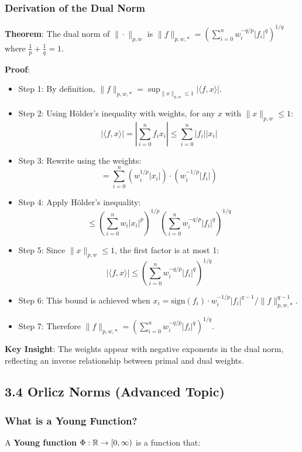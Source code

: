 \documentclass{amsart}
\let\originalmathbb\mathbb
\renewcommand{\mathbb}[1]{%
    \ifstrequal{#1}{1}{\mathbbm{#1}}{\originalmathbb{#1}}%
}
\theoremstyle{plain}
\theoremstyle{definition}
\theoremstyle{remark}
\begin{document}
\subsubsection{Derivation of the Dual Norm}

\textbf{Theorem}: The dual norm of $\|\cdot\|_{p,w}$ is $\|f\|_{p,w,*} = \left( \sum_{i=0}^n w_i^{-q/p} |f_i|^q \right)^{1/q}$ where $\frac{1}{p} + \frac{1}{q} = 1$.

\textbf{Proof}:

\begin{itemize}
	\item Step 1: By definition, $\|f\|_{p,w,*} = \sup_{\|x\|_{p,w} \leq 1} |\langle f, x \rangle|$.
	\item Step 2: Using Hölder's inequality with weights, for any $x$ with $\|x\|_{p,w} \leq 1$:
\[
|\langle f, x \rangle| = \left|\sum_{i=0}^n f_i x_i\right| \leq \sum_{i=0}^n |f_i| |x_i|
\]
	\item Step 3: Rewrite using the weights:
\[
= \sum_{i=0}^n (w_i^{1/p} |x_i|) \cdot (w_i^{-1/p} |f_i|)
\]
	\item Step 4: Apply Hölder's inequality:
\[
\leq \left(\sum_{i=0}^n w_i |x_i|^p\right)^{1/p} \left(\sum_{i=0}^n w_i^{-q/p} |f_i|^q\right)^{1/q}
\]
	\item Step 5: Since $\|x\|_{p,w} \leq 1$, the first factor is at most 1:
\[
|\langle f, x \rangle| \leq \left(\sum_{i=0}^n w_i^{-q/p} |f_i|^q\right)^{1/q}
\]
	\item Step 6: This bound is achieved when $x_i = \text{sign}(f_i) \cdot w_i^{-1/p} |f_i|^{q-1} / \|f\|_{p,w,*}^{q-1}$.
	\item Step 7: Therefore $\|f\|_{p,w,*} = \left(\sum_{i=0}^n w_i^{-q/p} |f_i|^q\right)^{1/q}$.
\end{itemize}

\textbf{Key Insight}: The weights appear with negative exponents in the dual norm, reflecting an inverse relationship between primal and dual weights.

\subsection{3.4 Orlicz Norms (Advanced Topic)}

\subsubsection{What is a Young Function?}

A \textbf{Young function} $\Phi: \mathbb{R} \to [0, \infty)$ is a function that:
\end{document}
